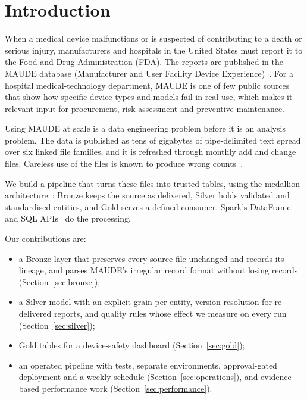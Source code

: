 \section{Introduction}
\label{sec:introduction}

When a medical device malfunctions or is suspected of contributing to a death or serious injury,
manufacturers and hospitals in the United States must report it to the Food and Drug
Administration (FDA). The reports are published in the MAUDE database (Manufacturer and User
Facility Device Experience)~\cite{fda-mdr-files}. For a hospital medical-technology department,
MAUDE is one of few public sources that show how specific device types and models fail in real
use, which makes it relevant input for procurement, risk assessment and preventive maintenance.

Using MAUDE at scale is a data engineering problem before it is an analysis problem. The data is
published as tens of gigabytes of pipe-delimited text spread over six linked file families, and
it is refreshed through monthly add and change files. Careless use of the files is known to
produce wrong counts~\cite{ensign2017primer}.

We build a pipeline that turns these files into trusted tables, using the medallion
architecture~\cite{armbrust2021lakehouse}: Bronze keeps the source as delivered, Silver holds
validated and standardised entities, and Gold serves a defined consumer. Spark's DataFrame and
SQL APIs~\cite{armbrust2015sparksql,zaharia2016spark} do the processing.


Our contributions are:
\begin{itemize}
  \item a Bronze layer that preserves every source file unchanged and records its lineage,
        and parses MAUDE's irregular record format without losing records
        (Section~\ref{sec:bronze});
  \item a Silver model with an explicit grain per entity, version resolution for re-delivered
        reports, and quality rules whose effect we measure on every run
        (Section~\ref{sec:silver});
  \item Gold tables for a device-safety dashboard (Section~\ref{sec:gold});
  \item an operated pipeline with tests, separate environments, approval-gated deployment and a
        weekly schedule (Section~\ref{sec:operations}), and evidence-based performance work
        (Section~\ref{sec:performance}).
\end{itemize}
